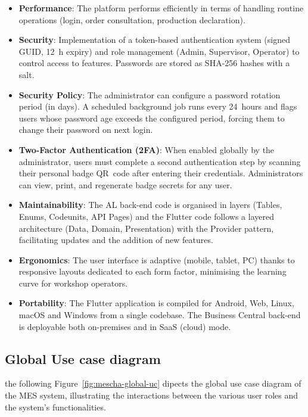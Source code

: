 \begin{itemize}

	\item \textbf{Performance}: The platform performs efficiently in terms of handling
	      routine operations (login, order consultation, production declaration).

	\item \textbf{Security}: Implementation of a token-based authentication system
	      (signed GUID, 12~h expiry) and role management (Admin, Supervisor, Operator) to
	      control access to features. Passwords are stored as SHA-256 hashes with a salt.

	\item \textbf{Security Policy}: The administrator can configure a password rotation
	      period (in days). A scheduled background job runs every 24~hours and flags users
	      whose password age exceeds the configured period, forcing them to change their
	      password on next login.

	\item \textbf{Two-Factor Authentication (2FA)}: When enabled globally by the
	      administrator, users must complete a second authentication step by scanning their
	      personal badge QR~code after entering their credentials. Administrators can view,
	      print, and regenerate badge secrets for any user.

	\item \textbf{Maintainability}: The AL back-end code is organised in layers
	      (Tables, Enums, Codeunits, API Pages) and the Flutter code follows a layered
	      architecture (Data, Domain, Presentation) with the Provider pattern, facilitating
	      updates and the addition of new features.

	\item \textbf{Ergonomics}: The user interface is adaptive (mobile, tablet, PC)
	      thanks to responsive layouts dedicated to each form factor, minimising the learning
	      curve for workshop operators.

	\item \textbf{Portability}: The Flutter application is compiled for Android,
	      Web, Linux, macOS and Windows from a single codebase. The Business Central back-end
	      is deployable both on-premises and in SaaS (cloud) mode.
\end{itemize}


\subsection{Global Use case diagram}
the following Figure~\ref{fig:mescha-global-uc} dipects the global use case diagram of the MES system, illustrating the interactions between the various user roles and the system's functionalities.

